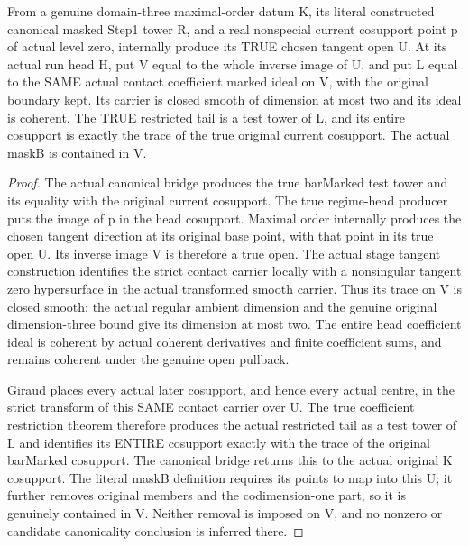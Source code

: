 \begin{theorem}
\label{hir:zero-contact-actual-enlarged-coherent-model}
From a genuine domain-three maximal-order datum K, its literal constructed
canonical masked Step1 tower R, and a real nonspecial current cosupport point
p of actual level zero, internally produce its TRUE chosen tangent open U.
At its actual run head H, put V equal to the whole inverse image of U, and
put L equal to the SAME actual contact coefficient marked ideal on V, with
the original boundary kept. Its carrier is closed smooth of dimension at
most two and its ideal is coherent. The TRUE restricted tail is a test
tower of L, and its entire cosupport is exactly the trace of the true
original current cosupport. The actual maskB is contained in V.
\end{theorem}
\leanok
\begin{proof}
The actual canonical bridge produces the true barMarked test tower and
its equality with the original current cosupport. The true regime-head
producer puts the image of p in the head cosupport. Maximal order internally
produces the chosen tangent direction at its original base point, with that
point in its true open U. Its inverse image V is therefore a true open.
The actual stage tangent construction identifies the strict contact carrier
locally with a nonsingular tangent zero hypersurface in the actual transformed
smooth carrier. Thus its trace on V is closed smooth; the actual regular
ambient dimension and the genuine original dimension-three bound give its
dimension at most two. The entire head coefficient ideal is coherent by
actual coherent derivatives and finite coefficient sums, and remains coherent
under the genuine open pullback.

Giraud places every actual later cosupport, and hence every actual centre,
in the strict transform of this SAME contact carrier over U. The true
coefficient restriction theorem therefore produces the actual restricted
tail as a test tower of L and identifies its ENTIRE cosupport exactly with
the trace of the original barMarked cosupport. The canonical bridge returns
this to the actual original K cosupport. The literal maskB definition
requires its points to map into this U; it further removes original members
and the codimension-one part, so it is genuinely contained in V. Neither
removal is imposed on V, and no nonzero or candidate canonicality conclusion
is inferred there.
\end{proof}

